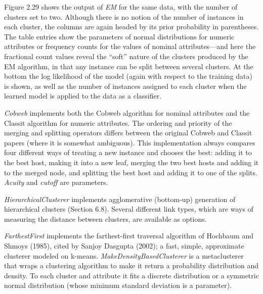 Figure 2.29 shows the output of \textit{EM} for the same data, with
the number of clusters set to two. Although there is no notion of the
number of instances in each cluster, the columns are again headed by
its prior probability in parentheses. The table entries show the
parameters of normal distributions for numeric attributes or frequency
counts for the values of nominal attributes—and here the fractional
count values reveal the ``soft'' nature of the clusters produced by the
EM algorithm, in that any instance can be split between several
clusters. At the bottom the log likelihood of the model (again with
respect to the training data) is shown, as well as the number of
instances assigned to each cluster when the learned model is applied
to the data as a classifier.

\textit{Cobweb} implements both the Cobweb algorithm for nominal
attributes and the Classit algorithm for numeric attributes. The
ordering and priority of the merging and splitting operators differs
between the original Cobweb and Classit papers (where it is somewhat
ambiguous). This implementation always compares four different ways of
treating a new instance and chooses the best: adding it to the best
host, making it into a new leaf, merging the two best hosts and adding
it to the merged node, and splitting the best host and adding it to
one of the splits. \textit{Acuity} and \textit{cutoff} are parameters.

\textit{HierarchicalClusterer} implements agglomerative (bottom-up)
generation of hierarchical clusters (Section 6.8). Several different
link types, which are ways of measuring the distance between clusters,
are available as options.

\textit{FarthestFirst} implements the farthest-first traversal
algorithm of Hochbaum and Shmoys (1985), cited by Sanjoy Dasgupta
(2002); a fast, simple, approximate clusterer modeled on
k-means. \textit{MakeDensityBasedClusterer} is a metaclusterer that
wraps a clustering algorithm to make it return a probability
distribution and density. To each cluster and attribute it fits a
discrete distribution or a symmetric normal distribution (whose
minimum standard deviation is a parameter).

